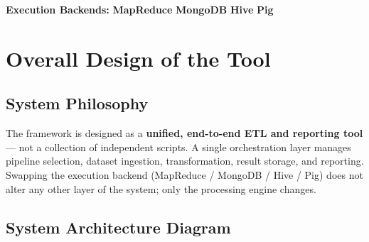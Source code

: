 \documentclass[11pt,a4paper]{article}
\begin{document}
\begin{titlepage}
\begin{center}
  {\small\color{MidGray}
    \textbf{Execution Backends:}\quad
    \textcolor{MRBlue}{\textbf{MapReduce}}\quad
    \textcolor{MongoGreen}{\textbf{MongoDB}}\quad
    \textcolor{HiveYellow}{\textbf{Hive}}\quad
    \textcolor{PigPink}{\textbf{Pig}}
  }
\end{center}

\vfill
{}
\end{titlepage}

\newpage
\thispagestyle{empty}
\tableofcontents
\newpage

\section{Overall Design of the Tool}

\subsection{System Philosophy}

The framework is designed as a \textbf{unified, end-to-end ETL and reporting tool} --- not a collection of independent scripts. A single orchestration layer manages pipeline selection, dataset ingestion, transformation, result storage, and reporting. Swapping the execution backend (MapReduce / MongoDB / Hive / Pig) does not alter any other layer of the system; only the processing engine changes.

\subsection{System Architecture Diagram}
\end{document}
